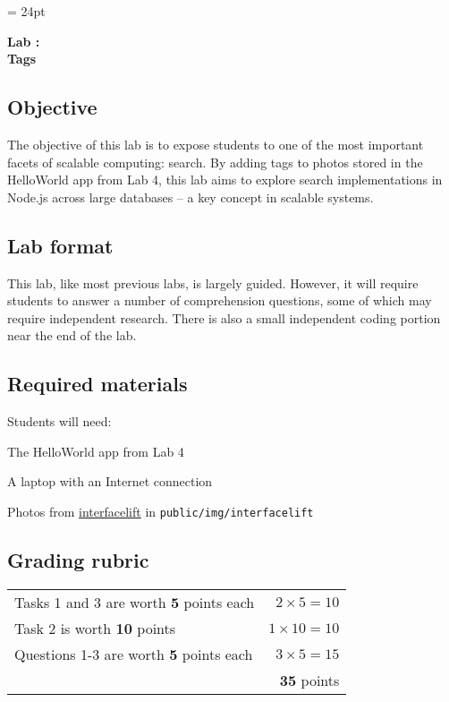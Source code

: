 \documentclass{article}
\begin{document}
\chead{\textcolor{Gray}{CSSE491 -- Scalable Computing Lab Assignment}}
\headsep = 24pt

\begin{center}
{ \large
\textbf{Lab \labnumber: \longproductname} \\
\textbf{Tags}
}
\end{center}

\subsection*{Objective}
The objective of this lab is to expose students to one of the most important facets of scalable computing: search. By adding tags to photos stored in the HelloWorld app from Lab 4, this lab aims to explore search implementations in Node.js across large databases -- a key concept in scalable systems.

\subsection*{Lab format}
This lab, like most previous labs, is largely guided. However, it will require students to answer a number of comprehension questions, some of which may require independent research. There is also a small independent coding portion near the end of the lab.

\subsection*{Required materials}
Students will need:
\begin{itemize*}
\item The HelloWorld app from Lab 4
\item A laptop with an Internet connection
\item Photos from \href{http://interfacelift.com}{interfacelift} in \verb!public/img/interfacelift!
\end{itemize*}

\subsection*{Grading rubric}
\begin{tabular}{p{5.5in} r}
Tasks 1 and 3 are worth \textbf{5} points each & $2 \times 5 = 10$ \\
Task 2 is worth \textbf{10} points & $1 \times 10 = 10$ \\
Questions 1-3 are worth \textbf{5} points each & $3 \times 5 = 15$ \\ \hline
& \textbf{35} points
\end{tabular}
\end{document}
